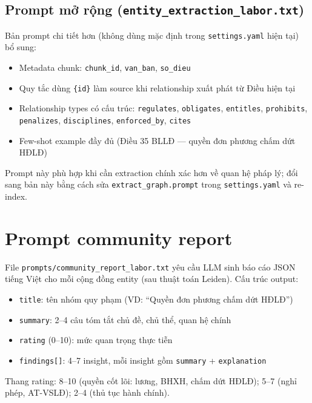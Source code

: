 \documentclass[../DoAn.tex]{subfiles}
\begin{document}
\subsection{Prompt mở rộng (\texttt{entity\_extraction\_labor.txt})}

Bản prompt chi tiết hơn (không dùng mặc định trong \texttt{settings.yaml} hiện tại) bổ sung:

\begin{itemize}[nosep, leftmargin=*]
    \item Metadata chunk: \texttt{chunk\_id}, \texttt{van\_ban}, \texttt{so\_dieu}
    \item Quy tắc dùng \texttt{\{id\}} làm source khi relationship xuất phát từ Điều hiện tại
    \item Relationship types có cấu trúc: \texttt{regulates}, \texttt{obligates}, \texttt{entitles}, \texttt{prohibits}, \texttt{penalizes}, \texttt{disciplines}, \texttt{enforced\_by}, \texttt{cites}
    \item Few-shot example đầy đủ (Điều 35 BLLĐ --- quyền đơn phương chấm dứt HĐLĐ)
\end{itemize}

Prompt này phù hợp khi cần extraction chính xác hơn về quan hệ pháp lý; đổi sang bản này bằng cách sửa \texttt{extract\_graph.prompt} trong \texttt{settings.yaml} và re-index.

\section{Prompt community report}
\label{appendix:b-community}

File \texttt{prompts/community\_report\_labor.txt} yêu cầu LLM sinh báo cáo JSON tiếng Việt cho mỗi cộng đồng entity (sau thuật toán Leiden). Cấu trúc output:

\begin{itemize}[nosep, leftmargin=*]
    \item \texttt{title}: tên nhóm quy phạm (VD: ``Quyền đơn phương chấm dứt HĐLĐ'')
    \item \texttt{summary}: 2--4 câu tóm tắt chủ đề, chủ thể, quan hệ chính
    \item \texttt{rating} (0--10): mức quan trọng thực tiễn
    \item \texttt{findings[]}: 4--7 insight, mỗi insight gồm \texttt{summary} + \texttt{explanation}
\end{itemize}

Thang rating: 8--10 (quyền cốt lõi: lương, BHXH, chấm dứt HĐLĐ); 5--7 (nghỉ phép, AT-VSLĐ); 2--4 (thủ tục hành chính).
\end{document}
